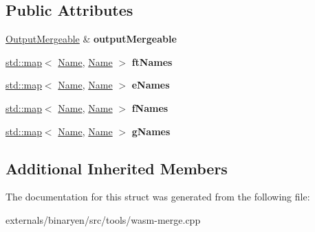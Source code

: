 \subsection*{Public Attributes}
\begin{DoxyCompactItemize}
\item 
\mbox{\label{struct_input_mergeable_a4e5ae7dcd4d6930293d08090fbbce884}} 
\mbox{\hyperlink{struct_output_mergeable}{Output\+Mergeable}} \& {\bfseries output\+Mergeable}
\item 
\mbox{\label{struct_input_mergeable_acebd8c693c0120346ceafcd1f492ba18}} 
\mbox{\hyperlink{classstd_1_1map}{std\+::map}}$<$ \mbox{\hyperlink{structwasm_1_1_name}{Name}}, \mbox{\hyperlink{structwasm_1_1_name}{Name}} $>$ {\bfseries ft\+Names}
\item 
\mbox{\label{struct_input_mergeable_a456ce434747f9809b7e80a7128160193}} 
\mbox{\hyperlink{classstd_1_1map}{std\+::map}}$<$ \mbox{\hyperlink{structwasm_1_1_name}{Name}}, \mbox{\hyperlink{structwasm_1_1_name}{Name}} $>$ {\bfseries e\+Names}
\item 
\mbox{\label{struct_input_mergeable_a4cb1928baaf1577e36b452cf29a8d9a7}} 
\mbox{\hyperlink{classstd_1_1map}{std\+::map}}$<$ \mbox{\hyperlink{structwasm_1_1_name}{Name}}, \mbox{\hyperlink{structwasm_1_1_name}{Name}} $>$ {\bfseries f\+Names}
\item 
\mbox{\label{struct_input_mergeable_ae31ac20fb172f8cdb50c4237e6eb91cb}} 
\mbox{\hyperlink{classstd_1_1map}{std\+::map}}$<$ \mbox{\hyperlink{structwasm_1_1_name}{Name}}, \mbox{\hyperlink{structwasm_1_1_name}{Name}} $>$ {\bfseries g\+Names}
\end{DoxyCompactItemize}
\subsection*{Additional Inherited Members}


The documentation for this struct was generated from the following file\+:\begin{DoxyCompactItemize}
\item 
externals/binaryen/src/tools/wasm-\/merge.\+cpp\end{DoxyCompactItemize}
